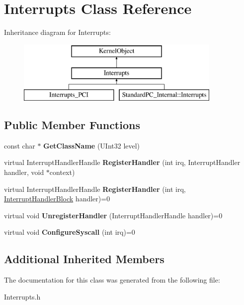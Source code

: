 \hypertarget{class_interrupts}{}\section{Interrupts Class Reference}
\label{class_interrupts}
Inheritance diagram for Interrupts\+:\begin{figure}[H]
\begin{center}
\leavevmode
\includegraphics[height=3.000000cm]{class_interrupts}
\end{center}
\end{figure}
\subsection*{Public Member Functions}
\begin{DoxyCompactItemize}
\item 
\mbox{\label{class_interrupts_a5420d99f7f52aff51c174680e75e05eb}} 
const char $\ast$ {\bfseries Get\+Class\+Name} (U\+Int32 level)
\item 
\mbox{\label{class_interrupts_a09a932aa8c2c50f54aa686ab3db94817}} 
virtual Interrupt\+Handler\+Handle {\bfseries Register\+Handler} (int irq, Interrupt\+Handler handler, void $\ast$context)
\item 
\mbox{\label{class_interrupts_a91ca8a05a51bed7a548c4540b8607caf}} 
virtual Interrupt\+Handler\+Handle {\bfseries Register\+Handler} (int irq, \hyperlink{classbicycle_1_1function}{Interrupt\+Handler\+Block} handler)=0
\item 
\mbox{\label{class_interrupts_aa82c8f24ba5c3edbd4a0d6f92f883741}} 
virtual void {\bfseries Unregister\+Handler} (Interrupt\+Handler\+Handle handler)=0
\item 
\mbox{\label{class_interrupts_ae2270331263a1ff421f87c84b88ce077}} 
virtual void {\bfseries Configure\+Syscall} (int irq)=0
\end{DoxyCompactItemize}
\subsection*{Additional Inherited Members}


The documentation for this class was generated from the following file\+:\begin{DoxyCompactItemize}
\item 
Interrupts.\+h\end{DoxyCompactItemize}
